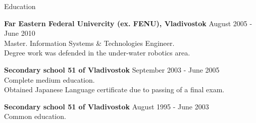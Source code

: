 \documentclass{resume}
\begin{document}

\begin{rSection}{Education}


{\bf Far Eastern Federal Univercity (ex. FENU), Vladivostok} \hfill {August 2005 - June 2010} \\ 
Master. Information Systems \& Technologies Engineer. \\
Degree work was defended in the under-water robotics area.

{\bf Secondary school 51 of Vladivostok} \hfill {September 2003 - June 2005} \\
Complete medium education. \\
Obtained Japanese Language certificate due to passing of a final exam.

{\bf Secondary school 51 of Vladivostok} \hfill {August 1995 - June 2003} \\
Common education.

\end{rSection}

\end{document}

